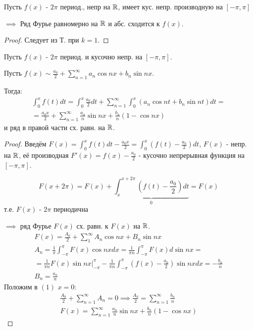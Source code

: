 \documentclass{article}
\begin{document}
\begin{corollary}
  Пусть $f(x)$ - $2\pi$ период., непр на $\mathbb{R}$, имеет кус. непр.
  производную на $[-\pi,\pi]$

  $\implies$ Ряд Фурье равномерно на $\mathbb{R}$ и абс. сходится к $f(x)$.
\end{corollary}
\begin{proof}
  Следует из Т. при $k=1$.
\end{proof}

\begin{theorem}
  Пусть $f(x)$ - $2\pi$ период. и кусочно непр. на $[-\pi, \pi]$.

  Пусть $f(x) \sim \frac{a_0}{2}+\sum_{n=1}^{\infty}a_n\cos nx + b_n \sin nx$.

  Тогда:
  \begin{gather*}
    \int_{0}^{x}f(t)dt=\int_{0}^{x}\frac{a_0}{2}dt+\sum_{n=1}^{\infty}\int_{0}^{x}(a_n\cos nt + b_n\sin nt)dt = \\
    = \frac{a_0x}{2}+\sum_{n=1}^{\infty}\frac{a_n}{n}\sin nx + \frac{b_n}{n}(1-\cos nx)
  \end{gather*}
  и ряд в правой части сх. равн. на $\mathbb{R}$.

\end{theorem}


\begin{proof}
  Введём $F(x)=\int_{0}^{x}f(t)dt-\frac{a_0x}{2}=\int_{0}^{x}(f(t)-\frac{a_0}{2})dt$,
  $F(x)$ - непр. на $\mathbb{R}$, её производная $F'(x)=f(x) - \frac{a_0}{2}$
  - кусочно непрерывная функция на $[-\pi,\pi]$.

  \[
    F(x+2\pi)=F(x)+\underbrace{\int_{x}^{x+2\pi}(f(t)-\frac{a_0}{2})dt}_{0}=F(x)
  \]
  т.е. $F(x)$ - $2\pi$ периодична

  $\implies$ ряд Фурье $F(x)$ сх. равн. к $F(x)$ на $\mathbb{R}$.
  \begin{gather*}
    F(x)=\frac{A_0}{2}+\sum_{1}^{\infty}A_n\cos nx + B_n\sin nx \tag{$1$} \\ 
    A_n=\frac{1}{\pi}\int_{-\pi}^{\pi}F(x)\cos nx dx=\frac{1}{\pi n}\int_{-\pi}^{\pi}F(x)d\sin nx =\\
    =\frac{1}{\pi n}F(x)\sin nx \Big|_{-\pi}^{\pi} - \frac{1}{\pi n}\int_{-\pi}^{\pi}(f(x)-\frac{a_0}{2})\sin nx dx 
    = -\frac{b_n}{n} \\ 
    B_n=\frac{a_n}{n}
  \end{gather*}
  Положим в $(1)$ $x=0$:
  \begin{gather*}
    \frac{A_0}{2}+\sum_{n=1}^{\infty}A_n=0 \implies \frac{A_0}{2}=\sum_{n=1}^{\infty}\frac{b_n}{n} \\ 
    F(x)=\sum_{n=1}^{\infty}\frac{a_n}{n}\sin nx + \frac{b_n}{n}(1-\cos nx)
  \end{gather*}
\end{proof}
\end{document}
